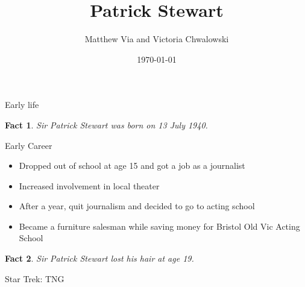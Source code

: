 \documentclass[xcolor=dvipsnames]{beamer}
\begin{document}
\author{Matthew Via and Victoria Chwalowski}
\title{Patrick Stewart}
\date{\today}
\begin{frame}{}
\titlepage
\newtheorem{fct}{Fact}

\end{frame}
\begin{frame}{Early life}
  \begin{fct}
    Sir Patrick Stewart was born on 13 July 1940.
  \end{fct}
\end{frame}

\begin{frame}{Early Career}
  \begin{itemize}
    \item Dropped out of school at age 15 and got a job as a journalist
    \item Increased involvement in local theater
    \item After a year, quit journalism and decided to go to acting school
    \item Became a furniture salesman while saving money for Bristol Old Vic
    Acting School
  \end{itemize}
  \begin{fct}
    Sir Patrick Stewart lost his hair at age 19.
  \end{fct}
\end{frame}



\begin{frame}{Star Trek: TNG}

\end{frame}
\end{document}
